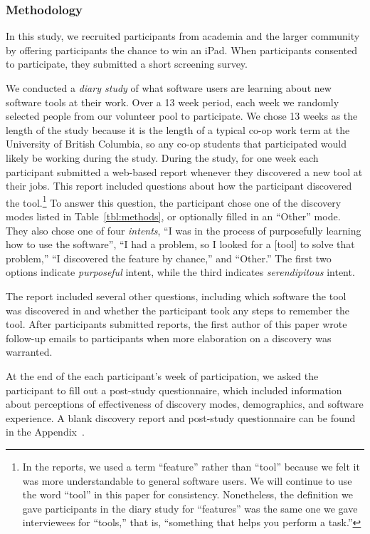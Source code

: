 \documentclass[smallextended]{svjour3}
\newcommand\context{mode\xspace}
\newcommand\contexts{modes\xspace}
\begin{document}
\subsubsection{Methodology}

\noindent
In this study, we recruited participants from academia and the larger community
by offering participants the chance to win an iPad.
When participants consented to participate, they submitted a short screening survey.

We conducted a \emph{diary study} of what software users 
are learning about new software tools at their work.
Over a 13 week period, each week we randomly selected people
from our volunteer pool to participate.
We chose 13 weeks as the length of the study because it is the 
length of a typical co-op work term at the University of British Columbia,
so any co-op students that participated would likely be working 
during the study.
During the study, for one week each participant submitted 
a web-based report whenever they discovered a new tool at their jobs.
This report included questions about how the participant discovered the 
tool.\footnote{In the reports, we used a term ``feature'' rather than ``tool''
because we felt it was more understandable to general software users.
We will continue to use the word ``tool'' in this paper for consistency.
Nonetheless, the definition we gave participants in the diary study for
``features'' was the same one we gave interviewees for ``tools,'' that is,
``something that helps you perform a task.''
}
To answer this question, the participant chose one of the discovery
\contexts listed in Table~\ref{tbl:methods}, or optionally filled in an
``Other'' \context.
They also chose one of four \emph{intents},
``I was in the process of purposefully learning how to use the software'',
``I had a problem, so I looked for a [tool] to solve that problem,''
``I discovered the feature by chance,'' and
``Other.''
The first two options indicate \emph{purposeful} intent, 
while the third indicates \emph{serendipitous} intent.
 
The report included several other questions, including which software the tool
was discovered in and whether the participant took any steps to remember the tool.
After participants submitted reports, the first author of this paper wrote follow-up
emails to participants when more elaboration on a discovery was warranted.

At the end of the each participant's week of participation, we asked the participant to 
fill out a post-study questionnaire, which included information about perceptions 
of effectiveness of discovery modes, demographics, and software experience.
A blank discovery report and post-study questionnaire can be found in the Appendix~\cite{appendix}.
 
\end{document}
